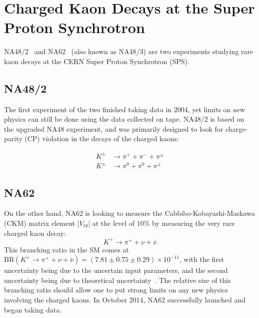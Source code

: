 \section{Charged Kaon Decays at the Super Proton Synchrotron}
NA48/2~\cite{Batley:1999fv} and NA62~\cite{Martellotti:2015kna} (also known as NA48/3) are two experiments studying rare kaon decays at the CERN Super Proton Synchrotron (SPS).

\subsection{NA48/2}
The first experiment of the two finished taking data in 2004, yet limits on new physics can still be done using the data collected on tape.
NA48/2 is based on the upgraded NA48 experiment, and was primarily designed to look for charge-parity (CP) violation in the decays of the charged kaons:

\begin{align}
K^\pm & \rightarrow \pi^+ + \pi^- + \pi^\pm \\
K^\pm & \rightarrow \pi^0 + \pi^0 + \pi^\pm
\end{align}

\subsection{NA62}
On the other hand, NA62 is looking to measure the Cabbibo-Kobayashi-Maskawa (CKM) matrix element $|V_{td}|$ at the level of $10\%$ by measuring the very rare charged kaon decay:
\begin{equation}
K^+ \rightarrow \pi^+ + \nu + \bar{\nu}
\end{equation}
This branching ratio in the SM comes at $\textrm{BR}(K^+ \rightarrow \pi^+ + \nu + \bar{\nu}) = (7.81 \pm 0.75 \pm 0.29) \times 10^{-11}$, with the first uncertainty being due to the uncertain input parameters, and the second uncertainty being due to theoretical uncertainty~\cite{Straub:2010ih}.
The relative size of this branching ratio should allow one to put strong limits on any new physics involving the charged kaons.
In October 2014, NA62 successfully launched and began taking data.

